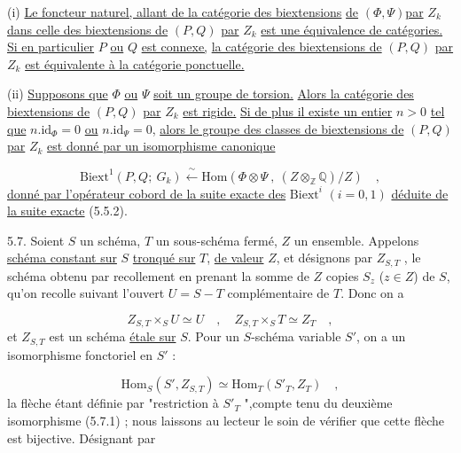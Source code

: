 (i) \underline{Le foncteur naturel, allant de la catégorie des biextensions}
\underline{de} $(\Phi,\Psi)$\underline{par} $Z_k$ \underline{dans celle des biextensions de} $(P,Q)$ \underline{par} $Z_k$ \underline{est une équivalence de catégories. Si en particulier} $P$ \underline{ou} $Q$ \underline{est connexe,} \underline{la catégorie des biextensions de} $(P,Q)$ \underline{par} $Z_k$ \underline{est équivalente à la catégorie ponctuelle.}

(ii) \underline{Supposons que} $\Phi$ \underline{ou} $\Psi$ \underline{soit un groupe de torsion.} \underline{Alors la catégorie des biextensions de} $(P,Q)$ \underline{par} $Z_k$ \underline{est rigide.} \underline{Si de plus il existe un entier} $n > 0$ \underline{tel que} $n.\mathrm{id}_{\Phi} = 0$ \underline{ou} $n.\mathrm{id}_{\Psi} = 0$, \underline{alors le groupe des classes de biextensions de} $(P,Q)$ \underline{par} $Z_k$ \underline{est donné par un isomorphisme canonique}

\begin{equation}\tag{5.6.1}
\mathrm{Biext}^1(P,Q;\ G_k) \xleftarrow{\ \sim\ } \mathrm{Hom}(\Phi \otimes \Psi\ ,\ (Z \otimes_{\mathbb{Z}} \mathbb{Q})/Z) \quad ,
\end{equation}
\underline{donné par l'opérateur cobord de la suite exacte des} $\mathrm{Biext}^i$ $(i=0,1)$ \underline{déduite de la suite exacte} (5.5.2).

5.7. Soient $S$ un schéma, $T$ un sous-schéma fermé, $Z$ un ensemble. Appelons \underline{schéma constant sur} $S$ \underline{tronqué sur} $T$, \underline{de valeur} $Z$, et désignons par $Z_{S,T}$ , le schéma obtenu par recollement en prenant la somme de $Z$ copies $S_z$ ($z \in Z$) de $S$, qu'on recolle suivant l'ouvert $U = S-T$ complémentaire de $T$. Donc on a

\begin{equation}\tag{5.7.1}
Z_{S,T} \times_S U \simeq U \quad , \quad Z_{S,T} \times_S T \simeq Z_T \quad ,
\end{equation}
et $Z_{S,T}$ est un schéma \underline{étale sur} $S$. Pour un $S$-schéma variable $S'$, on a un isomorphisme fonctoriel en $S'$ :

\begin{equation}\tag{5.7.2}
\mathrm{Hom}_S(S',Z_{S,T}) \simeq \mathrm{Hom}_T(S'_T,Z_T) \quad ,
\end{equation}
la flèche étant définie par "restriction à $S'_T$ ",compte tenu du deuxième isomorphisme (5.7.1) ; nous laissons au lecteur le soin de vérifier que cette flèche est bijective. Désignant par 


